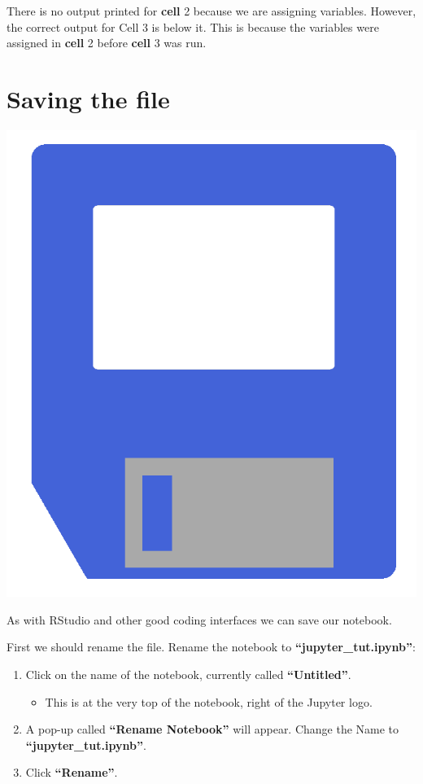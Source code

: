 \documentclass[
]{book}
\providecommand{\tightlist}{%
  \setlength{\itemsep}{0pt}\setlength{\parskip}{0pt}}
\begin{document}
There is no output printed for \textbf{cell} 2 because we are assigning variables. However, the correct output for Cell 3 is below it. This is because the variables were assigned in \textbf{cell} 2 before \textbf{cell} 3 was run.

\hypertarget{saving-the-file}{%
\section{Saving the file}\label{saving-the-file}}

\includegraphics{figures/r_save.png}

As with RStudio and other good coding interfaces we can save our notebook.

First we should rename the file. Rename the notebook to \textbf{``jupyter\_tut.ipynb''}:

\begin{enumerate}
\def\labelenumi{\arabic{enumi}.}
\tightlist
\item
  Click on the name of the notebook, currently called \textbf{``Untitled''}.

  \begin{itemize}
  \tightlist
  \item
    This is at the very top of the notebook, right of the Jupyter logo.
  \end{itemize}
\item
  A pop-up called \textbf{``Rename Notebook''} will appear. Change the Name to \textbf{``jupyter\_tut.ipynb''}.
\item
  Click \textbf{``Rename''}.
\end{enumerate}
\end{document}
